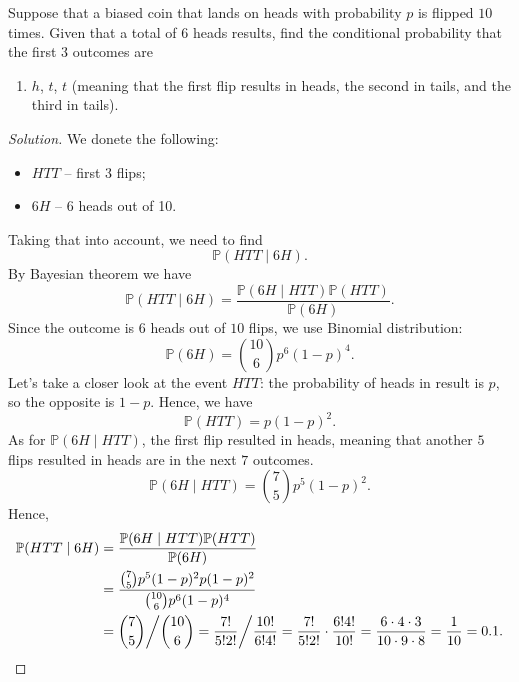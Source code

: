 \documentclass{article}[12pt]
\newenvironment{solution}
  {\renewcommand\qedsymbol{$\blacksquare$}\begin{proof}[Solution]}
  {\end{proof}}
\newenvironment{problem}[1]
  {\renewcommand\theinnercustomprblm{#1}\innercustomprblm}
  {\endinnercustomprblm}
\renewcommand{\P}{\mathbb{P}}
\begin{document}
\begin{problem}{4.50(a)}\normalfont
Suppose that a biased coin that lands on heads with probability $p$ is flipped $10$ times.
Given that a total of $6$ heads results, find the conditional probability that the first $3$ outcomes are
\begin{enumerate}[label=(\alph*)]
    \item $h$, $t$, $t$ (meaning that the first flip results in heads, the second in tails, and the third in tails).
\end{enumerate}
\end{problem}
\begin{solution}
We donete the following:
\begin{itemize}
    \item $HTT$ -- first 3 flips;
    \item $6H$ -- 6 heads out of 10.
\end{itemize}
Taking that into account, we need to find
\begin{equation*}
    \P(HTT\mid 6H).
\end{equation*}
By Bayesian theorem we have
\begin{equation*}
    \P(HTT\mid 6H) = \dfrac{\P(6H\mid HTT)\P(HTT)}{\P(6H)}.
\end{equation*}
Since the outcome is $6$ heads out of $10$ flips, we use Binomial distribution:
\begin{equation*}
    \P(6H) = \binom{10}{6}p^{6}(1 - p)^{4}.
\end{equation*}
Let's take a closer look at the event $HTT$: the probability of heads in result is $p$, so the opposite is $1 - p$.
Hence, we have
\begin{equation*}
    \P(HTT) = p(1 - p)^{2}.
\end{equation*}
As for $\P(6H\mid HTT)$, the first flip resulted in heads, meaning that another $5$ flips resulted in heads are in the next $7$ outcomes.
\begin{equation*}
    \P(6H\mid HTT) = \binom{7}{5}p^{5}(1 - p)^{2}.
\end{equation*}
Hence,
\begin{align*}
    \P(HTT\mid 6H) &= \dfrac{\P(6H\mid HTT)\P(HTT)}{\P(6H)}
    \\
    &=\dfrac{\binom{7}{5}p^{5}(1 - p)^{2}p(1 - p)^{2}}{\binom{10}{6}p^{6}(1 - p)^{4}}
    \\
    &=\dbinom{7}{5}\bigg/\dbinom{10}{6} = \dfrac{7!}{5!2!}\bigg/\dfrac{10!}{6!4!} = \dfrac{7!}{5!2!}\cdot\dfrac{6!4!}{10!} = \dfrac{6\cdot 4\cdot 3}{10\cdot 9\cdot 8} = \dfrac{1}{10} = 0.1.
\end{align*}
\end{solution}
\end{document}
